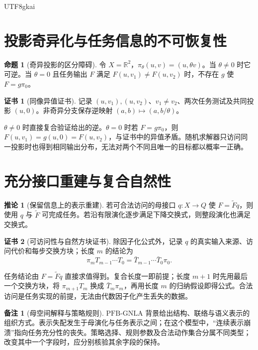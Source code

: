 \documentclass[12pt]{report}
\makeatletter
\theoremstyle{definition}
\newtheorem{proposition}{命题}[chapter]
\newtheorem{corollary}{推论}[chapter]
\newtheorem{remark}{备注}[chapter]
\newtheorem{Certificate}{证书}[chapter]
\renewenvironment{proof}[1][\proofname]{\par
  \pushQED{\qed}\normalfont
  \topsep6\p@\@plus6\p@\relax
  \trivlist
  \item[\hskip\labelsep\normalfont #1\@addpunct{.}]\ignorespaces
}{
  \popQED\endtrivlist\@endpefalse
}
\newcommand{\RR}{\mathbb R}
\newcommand{\PFB}{\mathrm{PFB\mbox{-}GNLA}}
\makeatother
\begin{document}
\begin{CJK*}{UTF8}{gkai}
\section{投影奇异化与任务信息的不可恢复性}
\begin{proposition}[奇异投影的区分障碍]
\label{prop:singular}
令 \(X=\RR^2\)，\(\pi_\theta(u,v)=(u,\theta v)\)。当 \(\theta\ne0\) 时它可逆。当 \(\theta=0\) 且任务输出 \(F\) 满足 \(F(u,v_1)\ne F(u,v_2)\) 时，不存在 \(g\) 使 \(F=g\pi_0\)。
\end{proposition}
\begin{Certificate}[同像异值证书]
记录 \((u,v_1),(u,v_2)\)、\(v_1\ne v_2\)、两次任务测试及共同投影 \((u,0)\)。非奇异分支保存逆映射 \((a,b)\mapsto(a,b/\theta)\)。
\end{Certificate}
\begin{proof}
\(\theta\ne0\) 时直接复合验证给出的逆。\(\theta=0\) 时若 \(F=g\pi_0\)，则
\(F(u,v_1)=g(u,0)=F(u,v_2)\)，与证书中的异值矛盾。随机求解器只访问同一投影时也得到相同输出分布，无法对两个不同且唯一的目标都以概率一正确。
\end{proof}

\section{充分接口重建与复合自然性}
\begin{corollary}[保留信息上的表示重建]
\label{cor:reconstruct}
若可合法访问的母接口 \(q:X\to Q\) 使 \(F=\widetilde Fq\)，则使用 \(q\) 与 \(\widetilde F\) 可完成任务。若沿有限演化逐步满足下降交换式，则整段演化也满足交换式。
\end{corollary}
\begin{Certificate}[可访问性与自然方块证书]
除因子化公式外，记录 \(q\) 的真实输入来源、访问代价和每步交换方块；长度 \(m\) 的结论为
\[
\pi_mT_{m-1}\cdots T_0=\bar T_{m-1}\cdots\bar T_0\pi_0.
\]
\end{Certificate}
\begin{proof}
任务结论由 \(F=\widetilde Fq\) 直接求值得到。复合长度一即前提；长度 \(m+1\) 时先用最后一个交换方块，将 \(\pi_{m+1}T_m\) 换成 \(\bar T_m\pi_m\)，再用长度 \(m\) 的归纳假设即得公式。合法访问是任务实现的前提，无法由代数因子化产生丢失的数据。
\end{proof}
\begin{remark}[母空间解释与策略规则]
\(\PFB\) 背景给出结构、联络与语义表示的组织方式\cite{pure,app3}。表示失配发生于母演化与任务表示之间；在这个模型中，“连续表示崩溃”指向任务充分性的丧失。策略选择、规则参数及合法动作集合分属不同类型；改变其中一个字段时，应分别核验其余字段的保持。
\end{remark}


\end{CJK*}
\end{document}

